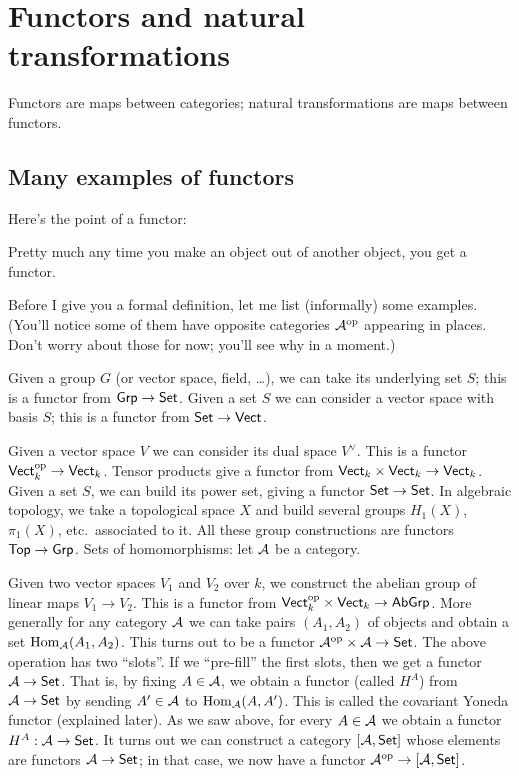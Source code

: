 \chapter{Functors and natural transformations}
\label{ch:functors}
Functors are maps between categories; natural transformations are maps between functors.

\section{Many examples of functors}
Here's the point of a functor:
\begin{moral}
	Pretty much any time you make an object out of another object,
	you get a functor.
\end{moral}
Before I give you a formal definition, let me list (informally) some examples.
(You'll notice some of them have opposite categories $\AA\op$ appearing in places.
Don't worry about those for now; you'll see why in a moment.)
\begin{itemize}
	\ii Given a group $G$ (or vector space, field, \dots), we can take its underlying set $S$;
	this is a functor from $\catname{Grp} \to \catname{Set}$.
	\ii Given a set $S$ we can consider a vector space with basis $S$;
	this is a functor from $\catname{Set} \to \catname{Vect}$.

	\ii Given a vector space $V$ we can consider its dual space $V^\vee$.
	This is a functor $\catname{Vect}_k\op \to \catname{Vect}_k$.
	\ii Tensor products give a functor from $\catname{Vect}_k \times \catname{Vect}_k \to \catname{Vect}_k$.
	\ii Given a set $S$, we can build its power set, giving a functor $\catname{Set} \to \catname{Set}$.
	\ii In algebraic topology, we take a topological space $X$ and build several groups $H_1(X)$, $\pi_1(X)$,
	etc.\ associated to it. All these group constructions are functors $\catname{Top} \to \catname{Grp}$.
	\ii Sets of homomorphisms: let $\AA$ be a category.
	\begin{itemize}
		\ii Given two vector spaces $V_1$ and $V_2$ over $k$,
		we construct the abelian group of linear maps $V_1 \to V_2$.
		This is a functor from $\catname{Vect}_k\op \times \catname{Vect}_k \to \catname{AbGrp}$.
		\ii More generally for any category $\AA$
		we can take pairs $(A_1, A_2)$ of objects and
		obtain a set $\Hom_{\AA}(A_1, A_2)$.
		This turns out to be a functor $\AA\op \times \AA \to \catname{Set}$.
		\ii The above operation has two ``slots''.
		If we ``pre-fill'' the first slots, then we get a functor $\AA \to \catname{Set}$.
		That is, by fixing $A \in \AA$, we obtain a functor (called $H^A$)
		from $\AA \to \catname{Set}$ by sending $A' \in \AA$ to $\Hom_{\AA} (A, A')$.
		This is called the covariant Yoneda functor (explained later).
		\ii As we saw above,
		for every $A \in \AA$ we obtain a functor $H^A : \AA \to \catname{Set}$.
		It turns out we can construct a category $[\AA, \catname{Set}]$
		whose elements are functors $\AA \to \catname{Set}$;
		in that case, we now have a functor $\AA\op \to [\AA, \catname{Set}]$.
	\end{itemize}
\end{itemize}

